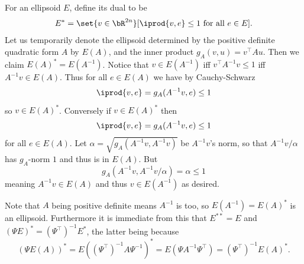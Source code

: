 \eproof

For an ellipsoid $E$, define its {\emphcolor dual} to be
$$ E^* = \set{v\in\bR^{2n}}[\iprod{v,e}\leq1\hbox{ for all $e\in E$}] . $$
Let us temporarily denote the ellipsoid determined by the positive definite quadratic form $A$ by $E(A)$, and the inner product $g_A(v,u)=v^\top Au$.
Then we claim $E(A)^*=E(A^{-1})$.
Notice that $v\in E(A^{-1})$ iff $v^\top A^{-1}v\leq1$ iff $A^{-1}v\in E(A)$.
Thus for all $e\in E(A)$ we have by Cauchy-Schwarz
$$ \iprod{v,e} = g_A(A^{-1}v,e) \leq 1 $$
so $v\in E(A)^*$.
Conversely if $v\in E(A)^*$ then
$$ \iprod{v,e} = g_A(A^{-1}v,e) \leq 1 $$
for all $e\in E(A)$.
Let $\alpha=\sqrt{g_A(A^{-1}v,A^{-1}v)}$ be $A^{-1}v$'s norm, so that $A^{-1}v/\alpha$ has $g_A$-norm $1$ and thus is in $E(A)$.
But
$$ g_A(A^{-1}v,A^{-1}v/\alpha) = \alpha \leq 1 $$
meaning $A^{-1}v\in E(A)$ and thus $v\in E(A^{-1})$ as desired.

Note that $A$ being positive definite means $A^{-1}$ is too, so $E(A^{-1})=E(A)^*$ is an ellipsoid.
Furthermore it is immediate from this that $E^{**}=E$ and $(\Psi E)^*=(\Psi^\top)^{-1}E^*$, the latter being because
$$ (\Psi E(A))^* = E((\Psi^\top)^{-1}A\Psi^{-1})^* = E(\Psi A^{-1}\Psi^\top) = (\Psi^\top)^{-1}E(A)^* . $$

